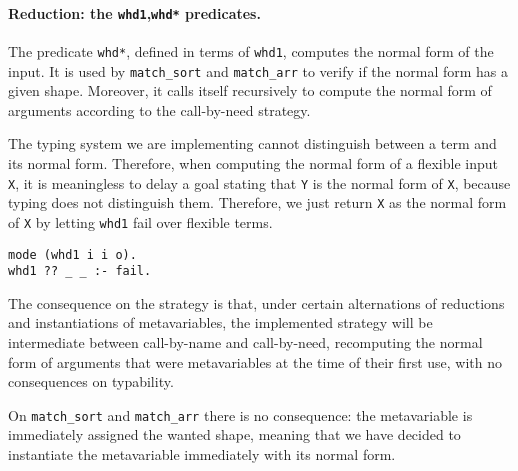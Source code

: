 \documentclass{easychair}
\begin{document}
\paragraph{Reduction: the \texttt{whd1},\texttt{whd*} predicates.}
The predicate \verb+whd*+, defined in terms of \verb+whd1+, computes the normal form of the input. It is used by \verb+match_sort+ and \verb+match_arr+ to verify if the normal form has a given shape. Moreover, it calls itself recursively to compute the normal form of arguments according to the call-by-need strategy.

The typing system we are implementing cannot distinguish between a term and its normal form. Therefore, when computing the normal form of a flexible input \verb+X+, it is meaningless to delay a goal stating that \verb+Y+ is the normal form of \verb+X+, because typing does not distinguish them.
Therefore, we just return \verb+X+ as the normal form of \verb+X+ by letting \verb+whd1+ fail over flexible terms.
\begin{Verbatim}
mode (whd1 i i o).
whd1 ?? _ _ :- fail.
\end{Verbatim}

The consequence on the strategy is that, under certain alternations of reductions and instantiations of metavariables, the implemented strategy will be intermediate between call-by-name and call-by-need, recomputing the normal form of arguments that were metavariables at the time of their first use, with no consequences on typability.

On \verb+match_sort+ and \verb+match_arr+ there is no consequence: the metavariable is immediately assigned the wanted shape, meaning that we have decided to instantiate the metavariable immediately with its normal form.

%
%
%
\end{document}
